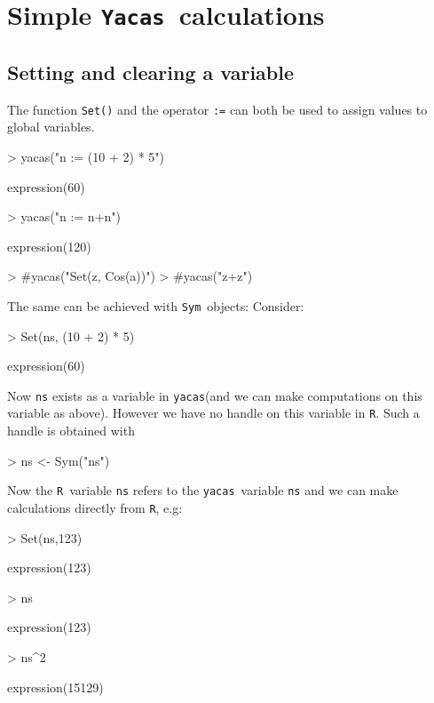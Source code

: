 \documentclass[]{article}
\newcommand{\yacas}{{\tt yacas}}
\newcommand{\code}[1]{{\tt #1}}
\def\yac{\texttt{Yacas}}
\def\R{\texttt{R}}
\def\sym{\texttt{Sym}}
\begin{document}
\section{Simple \yac\ calculations}


\subsection{Setting and clearing a variable}

The function \code{Set()} and the operator \code{:=} can both be used to assign
values to global variables. 
\begin{Schunk}
\begin{Sinput}
> yacas("n := (10 + 2) * 5")
\end{Sinput}
\begin{Soutput}
expression(60)
\end{Soutput}
\begin{Sinput}
> yacas("n := n+n")
\end{Sinput}
\begin{Soutput}
expression(120)
\end{Soutput}
\begin{Sinput}
> #yacas("Set(z, Cos(a))")
> #yacas("z+z")
\end{Sinput}
\end{Schunk}

The same can be achieved with \sym\ objects: Consider:
\begin{Schunk}
\begin{Sinput}
> Set(ns, (10 + 2) * 5)
\end{Sinput}
\begin{Soutput}
expression(60)
\end{Soutput}
\end{Schunk}

Now \code{ns} exists as a variable in \yacas (and we
can make computations on this variable as above).
However we have no handle on
this variable in \R. Such a handle is obtained with
\begin{Schunk}
\begin{Sinput}
> ns <- Sym("ns")
\end{Sinput}
\end{Schunk}
Now the \R\ variable \code{ns} refers to the \yacas\ variable
\code{ns} and we can make  calculations directly from \R, e.g:
\begin{Schunk}
\begin{Sinput}
> Set(ns,123)
\end{Sinput}
\begin{Soutput}
expression(123)
\end{Soutput}
\begin{Sinput}
> ns
\end{Sinput}
\begin{Soutput}
expression(123)
\end{Soutput}
\begin{Sinput}
> ns^2
\end{Sinput}
\begin{Soutput}
expression(15129)
\end{Soutput}
\end{Schunk}
\end{document}
